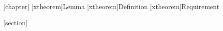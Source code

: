 [chapter]
[xtheorem]{Lemma}
[xtheorem]{Definition}
[xtheorem]{Requirement}

\newenvironment{theorem}[1][]{%
	\addtotheorems{Theorem}{#1}
	\begin{xtheorem}[#1]%
}{\end{xtheorem}}

\newenvironment{lemma}[1][]{%
	\addtotheorems{Lemma}{#1}
	\begin{xlemma}[#1]%
}{\end{xlemma}}

\newenvironment{definition}[1][]{%
	\addtotheorems{Definition}{#1}
	\begin{xdefinition}[#1]%
}{\end{xdefinition}}

\newenvironment{requirement}[1][]{%
	\addtotheorems{Requirement}{#1}
	\begin{xrequirement}[#1]%
}{\end{xrequirement}}

[section]
\newenvironment{apxtheorem}[1][]{%
	\addtotheorems{Theorem}{#1}
	\begin{xapxtheorem}[#1]%
}{\end{xapxtheorem}}

\theoremstyle{nonumberplain}
\theoremheaderfont{\sffamily\itshape}
\theoremsymbol{\ensuremath{\Box}}
\newtheorem{proof}{Proof}
\newtheorem{apxproof}{Proof}

